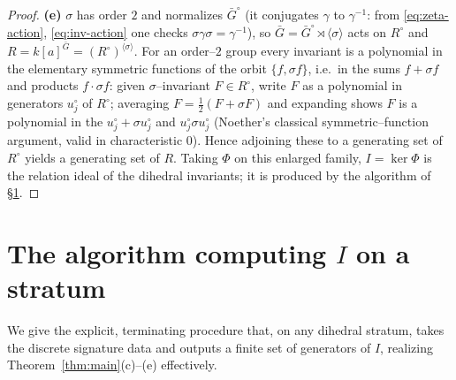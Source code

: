 \documentclass{amsart}
\theoremstyle{definition}
\begin{document}
\begin{proof}
\textbf{(e)} $\sigma$ has order $2$ and normalizes $\bar G^{\circ}$ (it conjugates
$\gamma$ to $\gamma^{-1}$: from \eqref{eq:zeta-action}, \eqref{eq:inv-action} one
checks $\sigma\gamma\sigma=\gamma^{-1}$), so
$\bar G=\bar G^{\circ}\rtimes\langle\sigma\rangle$ acts on $R^{\circ}$ and
$R=k[a]^{\bar G}=(R^{\circ})^{\langle\sigma\rangle}$. For an order--$2$ group every
invariant is a polynomial in the elementary symmetric functions of the orbit
$\{f,\sigma f\}$, i.e.\ in the sums $f+\sigma f$ and products $f\cdot\sigma f$:
given $\sigma$--invariant $F\in R^\circ$, write $F$ as a polynomial in generators
$u^\circ_j$ of $R^\circ$; averaging $F=\tfrac12(F+\sigma F)$ and expanding shows
$F$ is a polynomial in the $u^\circ_j+\sigma u^\circ_j$ and $u^\circ_j\sigma
u^\circ_j$ (Noether's classical symmetric--function argument, valid in
characteristic $0$). Hence adjoining these to a generating set of $R^{\circ}$
yields a generating set of $R$. Taking $\Phi$ on this enlarged family,
$I=\ker\Phi$ is the relation ideal of the dihedral invariants; it is produced by
the algorithm of \S\ref{sec:algo}.
\end{proof}

\section{The algorithm computing $I$ on a stratum}\label{sec:algo}

We give the explicit, terminating procedure that, on any dihedral stratum, takes
the discrete signature data and outputs a finite set of generators of $I$,
realizing Theorem~\ref{thm:main}(c)--(e) effectively.
\end{document}
